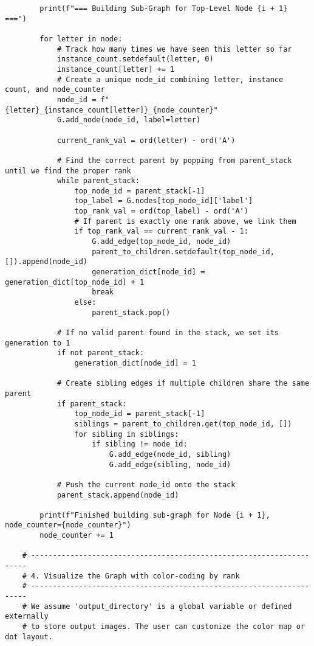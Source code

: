 \begin{lstlisting}
        print(f"=== Building Sub-Graph for Top-Level Node {i + 1} ===")

        for letter in node:
            # Track how many times we have seen this letter so far
            instance_count.setdefault(letter, 0)
            instance_count[letter] += 1
            # Create a unique node_id combining letter, instance count, and node_counter
            node_id = f"{letter}_{instance_count[letter]}_{node_counter}"
            G.add_node(node_id, label=letter)

            current_rank_val = ord(letter) - ord('A')

            # Find the correct parent by popping from parent_stack until we find the proper rank
            while parent_stack:
                top_node_id = parent_stack[-1]
                top_label = G.nodes[top_node_id]['label']
                top_rank_val = ord(top_label) - ord('A')
                # If parent is exactly one rank above, we link them
                if top_rank_val == current_rank_val - 1:
                    G.add_edge(top_node_id, node_id)
                    parent_to_children.setdefault(top_node_id, []).append(node_id)
                    generation_dict[node_id] = generation_dict[top_node_id] + 1
                    break
                else:
                    parent_stack.pop()

            # If no valid parent found in the stack, we set its generation to 1
            if not parent_stack:
                generation_dict[node_id] = 1

            # Create sibling edges if multiple children share the same parent
            if parent_stack:
                top_node_id = parent_stack[-1]
                siblings = parent_to_children.get(top_node_id, [])
                for sibling in siblings:
                    if sibling != node_id:
                        G.add_edge(node_id, sibling)
                        G.add_edge(sibling, node_id)

            # Push the current node_id onto the stack
            parent_stack.append(node_id)

        print(f"Finished building sub-graph for Node {i + 1}, node_counter={node_counter}")
        node_counter += 1

    # ---------------------------------------------------------------------
    # 4. Visualize the Graph with color-coding by rank
    # ---------------------------------------------------------------------
    # We assume 'output_directory' is a global variable or defined externally
    # to store output images. The user can customize the color map or dot layout.


\end{lstlisting}

